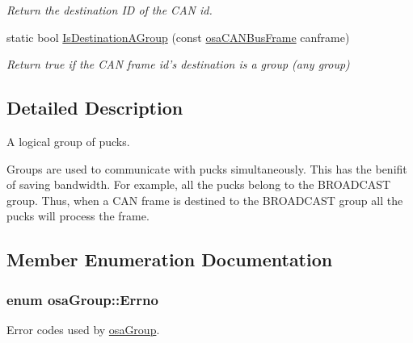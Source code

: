 \begin{DoxyCompactItemize}
\begin{DoxyCompactList}\small\item\em Return the destination I\-D of the C\-A\-N id. \end{DoxyCompactList}\item 
static bool \hyperlink{classosa_group_adb3cac1dcffb180ce07f762113e7686d}{Is\-Destination\-A\-Group} (const \hyperlink{classosa_c_a_n_bus_frame}{osa\-C\-A\-N\-Bus\-Frame} canframe)
\begin{DoxyCompactList}\small\item\em Return true if the C\-A\-N frame id's destination is a group (any group) \end{DoxyCompactList}\end{DoxyCompactItemize}


\subsection{Detailed Description}
A logical group of pucks. 

Groups are used to communicate with pucks simultaneously. This has the benifit of saving bandwidth. For example, all the pucks belong to the B\-R\-O\-A\-D\-C\-A\-S\-T group. Thus, when a C\-A\-N frame is destined to the B\-R\-O\-A\-D\-C\-A\-S\-T group all the pucks will process the frame. 

\subsection{Member Enumeration Documentation}
\hypertarget{classosa_group_a3ac590c39198a7533838db29b01b994f}{
\subsubsection[{Errno}]{\setlength{\rightskip}{0pt plus 5cm}enum {\bf osa\-Group\-::\-Errno}}}\label{classosa_group_a3ac590c39198a7533838db29b01b994f}


Error codes used by \hyperlink{classosa_group}{osa\-Group}. 

